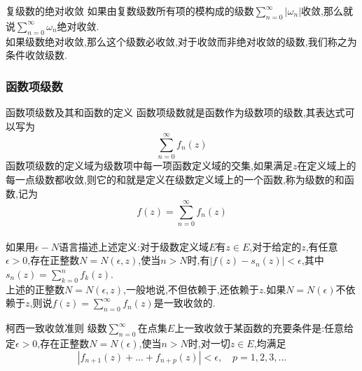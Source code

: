 \documentclass[zihao=-4,a4paper]{ctexart}
\begin{document}
\begin{mdefinition}{复级数的绝对收敛}
	如果由复数级数所有项的模构成的级数$\sum^{\infty}_{n=0} | {\omega}_{n} |$收敛,那么就说$\sum^{\infty}_{n=0} {\omega}_{n}$绝对收敛.\\
	如果级数绝对收敛,那么这个级数必收敛,对于收敛而非绝对收敛的级数,我们称之为条件收敛级数.
\end{mdefinition}

\subsubsection{函数项级数}

\begin{mdefinition}{函数项级数及其和函数的定义}
	函数项级数就是函数作为级数项的级数,其表达式可以写为
	\begin{equation}
		\sum^{\infty}_{n=0} {f}_{n} \left( {z} \right)
	\end{equation}
	函数项级数的定义域为级数项中每一项函数定义域的交集,如果满足$z$在定义域上的每一点级数都收敛,则它的和就是定义在级数定义域上的一个函数,称为级数的和函数,记为
	\begin{equation}
		{f} \left( {z} \right) = \sum^{\infty}_{n=0} {f}_{n} \left( {z} \right)
	\end{equation}\\

	如果用${\epsilon} - {N}$语言描述上述定义:对于级数定义域$E$有$z {\in} E$,对于给定的$z$,有任意${\epsilon} > {0}$,存在正整数$N = N\left( {\epsilon} , {z} \right)$,使当${n} > {N}$时,有$| {f} \left( {z} \right) - {s}_{n} \left( {z} \right) | < {\epsilon}$,其中${s}_{n} \left( {z} \right) = \sum^{n}_{k=0} {f}_{k} \left( {z} \right)$.\\

	上述的正整数${N} = {N} \left( {\epsilon} , {z} \right)$,一般地说,不但依赖于,还依赖于$z$.如果${N} = {N} \left( {\epsilon} \right)$不依赖于$z$,则说${f} \left( {z} \right) = \sum^{\infty}_{n=0} {f}_{n} \left( {z} \right)$是一致收敛的.
\end{mdefinition}

\begin{mtheorem}{柯西一致收敛准则}
	级数$\sum^{\infty}_{n=0}$在点集$E$上一致收敛于某函数的充要条件是:任意给定${\epsilon} > 0$,存在正整数${N} = {N}\left( {\epsilon} \right)$,使当${n} > {N}$时,对一切${z} {\in} {E}$,均满足
	\begin{equation}
		\left| {f}_{n+1} \left( {z} \right) + ... + {f}_{n+p} \left( {z} \right)\right| < {\epsilon}, {\quad} p = 1 , 2 , 3 , ...
	\end{equation}
\end{mtheorem}
\end{document}
